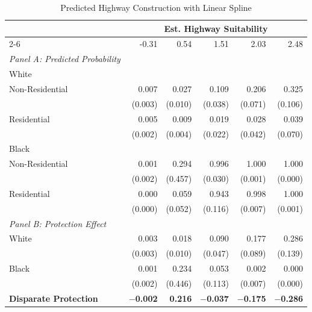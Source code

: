 \begin{table}[h]
\centering
\caption{Predicted Highway Construction with Linear Spline}
\label{tab:predicted_outcomes/mblack_mean_pct_logitinteraction}
\begin{threeparttable}
\begin{tabular*}{1\textwidth}{@{\extracolsep{\fill}}lr@{\hspace{1.2em}}r@{\hspace{1.2em}}r@{\hspace{1.2em}}r@{\hspace{1.2em}}r@{\hspace{1.2em}}}
\toprule
 & \multicolumn{5}{c}{Est. Highway Suitability} \\
\cmidrule(l){2-6}
 & -0.31 & 0.54 & 1.51 & 2.03 & 2.48 \\
\midrule
\textit{Panel A: Predicted Probability} & & & & & \\
\addlinespace[2pt]
White & & & & & \\
\quad Non-Residential & 0.007 & 0.027 & 0.109 & 0.206 & 0.325 \\
 & (0.003) & (0.010) & (0.038) & (0.071) & (0.106) \\[4pt]
\quad Residential & 0.005 & 0.009 & 0.019 & 0.028 & 0.039 \\
 & (0.002) & (0.004) & (0.022) & (0.042) & (0.070) \\[4pt]
Black & & & & & \\
\quad Non-Residential & 0.001 & 0.294 & 0.996 & 1.000 & 1.000 \\
 & (0.002) & (0.457) & (0.030) & (0.001) & (0.000) \\[4pt]
\quad Residential & 0.000 & 0.059 & 0.943 & 0.998 & 1.000 \\
 & (0.000) & (0.052) & (0.116) & (0.007) & (0.001) \\[4pt]
\midrule
\textit{Panel B: Protection Effect} & & & & & \\
\addlinespace[2pt]
White & 0.003 & 0.018\rlap{$^{*}$} & 0.090\rlap{$^{*}$} & 0.177\rlap{$^{**}$} & 0.286\rlap{$^{**}$} \\
 & (0.003) & (0.010) & (0.047) & (0.089) & (0.139) \\[4pt]
Black & 0.001 & 0.234 & 0.053 & 0.002 & 0.000 \\
 & (0.002) & (0.446) & (0.113) & (0.007) & (0.000) \\[4pt]
\addlinespace[2pt]
\textbf{Disparate Protection} & \textbf{$-$0.002} & \textbf{0.216} & \textbf{$-$0.037} & \textbf{$-$0.175}\rlap{$^{**}$} & \textbf{$-$0.286}\rlap{$^{**}$} \\

\end{tabular*}
\end{threeparttable}
\end{table}
